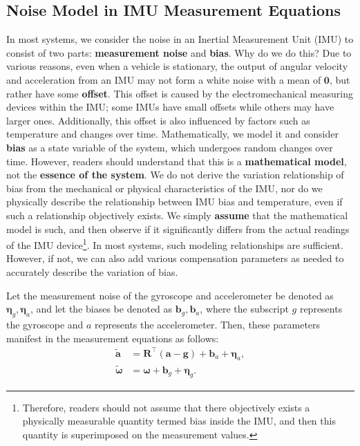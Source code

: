 \subsection{Noise Model in IMU Measurement Equations}
\label{sec:imu-noise}

In most systems, we consider the noise in an Inertial Measurement Unit (IMU) to consist of two parts: \textbf{measurement noise} and \textbf{bias}. Why do we do this? Due to various reasons, even when a vehicle is stationary, the output of angular velocity and acceleration from an IMU may not form a white noise with a mean of $\bm{0}$, but rather have some \textbf{offset}. This offset is caused by the electromechanical measuring devices within the IMU; some IMUs have small offsets while others may have larger ones. Additionally, this offset is also influenced by factors such as temperature and changes over time. Mathematically, we model it and consider \textbf{bias} as a state variable of the system, which undergoes random changes over time. However, readers should understand that this is a \textbf{mathematical model}, not the \textbf{essence of the system}. We do not derive the variation relationship of bias from the mechanical or physical characteristics of the IMU, nor do we physically describe the relationship between IMU bias and temperature, even if such a relationship objectively exists. We simply \textbf{assume} that the mathematical model is such, and then observe if it significantly differs from the actual readings of the IMU device\footnote{Therefore, readers should not assume that there objectively exists a physically measurable quantity termed bias inside the IMU, and then this quantity is superimposed on the measurement values.}. In most systems, such modeling relationships are sufficient. However, if not, we can also add various compensation parameters as needed to accurately describe the variation of bias.

Let the measurement noise of the gyroscope and accelerometer be denoted as $\boldsymbol{\eta}_g, \boldsymbol{\eta}_a$, and let the biases be denoted as $\bm{b}_g, \bm{b}_a$, where the subscript $g$ represents the gyroscope and $a$ represents the accelerometer. Then, these parameters manifest in the measurement equations as follows:
\begin{subequations}\label{eq:imu-measurement}
	\begin{align}
		\tilde{\bm{a}} &= \bm{R}^\top (\bm{a} - \bm{g}) + \bm{b}_a + \boldsymbol{\eta}_a, \\
		\tilde{\boldsymbol{\omega}} &= \boldsymbol{\omega} + \bm{b}_g + \boldsymbol{\eta}_g.
	\end{align}
\end{subequations}

